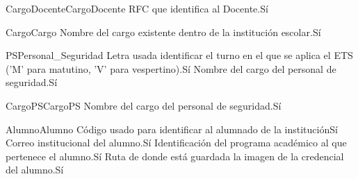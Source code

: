 \begin{cdtEntidad}{CargoDocente}{CargoDocente}
	{RFC que identifica al Docente.}{Sí}
\end{cdtEntidad}
\begin{cdtEntidad}{Cargo}{Cargo}
	{Nombre del cargo existente dentro de la institución escolar.}{Sí}
\end{cdtEntidad}
\begin{cdtEntidad}{PS}{Personal\_Seguridad}
	{Letra usada identificar el turno en el que se aplica el ETS ('M' para matutino, 'V' para vespertino).}{Sí}
	{Nombre del cargo del personal de seguridad.}{Sí}
\end{cdtEntidad}
\begin{cdtEntidad}{CargoPS}{CargoPS}
	{Nombre del cargo del personal de seguridad.}{Sí}
\end{cdtEntidad}
\begin{cdtEntidad}{Alumno}{Alumno}
	{Código usado para identificar al alumnado de la institución}{Sí}
	{Correo institucional del alumno.}{Sí}
	{Identificación del programa académico al que pertenece el alumno.}{Sí}
	{Ruta de donde está guardada la imagen de la credencial del alumno.}{Sí}
\end{cdtEntidad}
